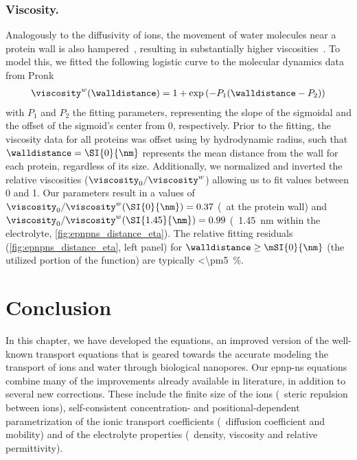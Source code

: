 \subsubsection{Viscosity.}
%
Analogously to the diffusivity of ions, the movement of water molecules near a protein wall is also
hampered~\cite{Makarov-1998}, resulting in substantially higher viscosities~\cite{Pronk-2014}. To model this,
we fitted the following logistic curve to the molecular dynamics data from Pronk \etal{}~\cite{Pronk-2014}
%
\begin{align}\label{eq:epnpns_distance_eta}
  \viscosity^w (\walldistance) = 1 + \exp{ \left( -P_1 (\walldistance - P_2) \right) }
\end{align}
%
with $P_1$ and $P_2$ the fitting parameters, representing the slope of the sigmoidal and the offset of the
sigmoid's center from 0, respectively. Prior to the fitting, the viscosity data for all proteins was offset
using by hydrodynamic radius, such that $\walldistance = \SI{0}{\nm}$ represents the mean distance from the
wall for each protein, regardless of its size. Additionally, we normalized and inverted the relative
viscosities ($\viscosity_0 / \viscosity^w$) allowing us to fit values between 0 and 1. Our parameters result
in a values of $\viscosity_0 / \viscosity^w (\SI{0}{\nm}) = 0.37$ (\ie~at the protein wall) and $\viscosity_0
/ \viscosity^w (\SI{1.45}{\nm}) = 0.99$ (\ie~\SI{1.45}{\nm} within the electrolyte,
\cref{fig:epnpns_distance_eta}). The relative fitting residuals (\cref{fig:epnpns_distance_eta}, left panel)
for $\walldistance \ge \mSI{0}{\nm}$ (the utilized portion of the function) are typically
\SI{<\pm5}{\percent}.


\section{Conclusion}
%
\label{sec:epnp-ns:conclusion}
%

In this chapter, we have developed the  equations, an improved version of the well-known
transport equations that is geared towards the accurate modeling the transport of ions and water through
biological nanopores. Our \gls{epnp-ns} equations combine many of the improvements already available in
literature, in addition to several new corrections. These include the finite size of the ions (\ie~steric
repulsion between ions), self-consistent concentration- and positional-dependent parametrization of the ionic
transport coefficients (\ie~diffusion coefficient and mobility) and of the electrolyte properties
(\ie~density, viscosity and relative permittivity).

